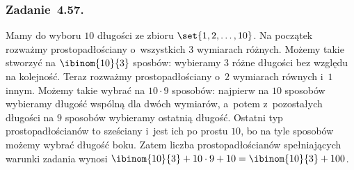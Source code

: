 \subsubsection*{Zadanie~4.57.}
Mamy do wyboru \(10\) długości ze zbioru \(\set{1, 2, \ldots, 10}\). Na początek rozważmy prostopadłościany o~wszystkich \(3\) wymiarach różnych. Możemy takie stworzyć na \(\ibinom{10}{3}\) sposbów: wybieramy \(3\) różne długości bez względu na kolejność. Teraz rozważmy prostopadłościany o~\(2\) wymiarach równych i~\(1\) innym. Możemy takie wybrać na \(10 \cdot 9\) sposobów: najpierw na \(10\) sposobów wybieramy długość wspólną dla dwóch wymiarów, a~potem z~pozostałych długości na \(9\) sposobów wybieramy ostatnią długość. Ostatni typ prostopadłościanów to sześciany i~jest ich po prostu \(10\), bo na tyle sposobów możemy wybrać długość boku. Zatem liczba prostopadłościanów spełniających warunki zadania wynosi \(\ibinom{10}{3} + 10 \cdot 9 + 10 = \ibinom{10}{3} + 100\).
